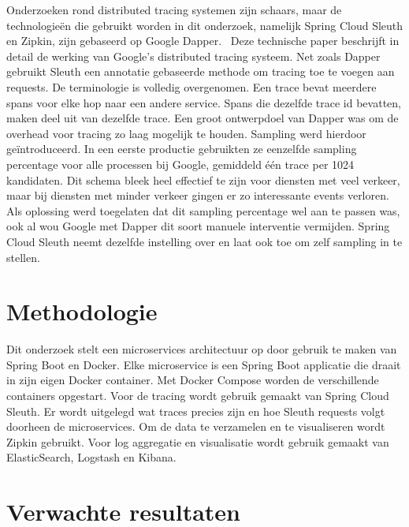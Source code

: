 \documentclass[fleqn,10pt]{voorstel}
\begin{document}
Onderzoeken rond distributed tracing systemen zijn schaars, maar de technologieën die gebruikt worden in dit onderzoek, namelijk Spring Cloud Sleuth en Zipkin, zijn gebaseerd op Google Dapper.~\autocite{Dapper2010} Deze technische paper beschrijft in detail de werking van Google's distributed tracing systeem. Net zoals Dapper gebruikt Sleuth een annotatie gebaseerde methode om tracing toe te voegen aan requests. De terminologie is volledig overgenomen. Een trace bevat meerdere spans voor elke hop naar een andere service. Spans die dezelfde trace id bevatten, maken deel uit van dezelfde trace. Een groot ontwerpdoel van Dapper was om de overhead voor tracing zo laag mogelijk te houden. Sampling werd hierdoor geïntroduceerd. In een eerste productie gebruikten ze eenzelfde sampling percentage voor alle processen bij Google, gemiddeld één trace per 1024 kandidaten. Dit schema bleek heel effectief te zijn voor diensten met veel verkeer, maar bij diensten met minder verkeer gingen er zo interessante events verloren. Als oplossing werd toegelaten dat dit sampling percentage wel aan te passen was, ook al wou Google met Dapper dit soort manuele interventie vermijden. Spring Cloud Sleuth neemt dezelfde instelling over en laat ook toe om zelf sampling in te stellen. \\


\section{Methodologie}
\label{sec:methodologie}

Dit onderzoek stelt een microservices architectuur op door gebruik te maken van Spring Boot en Docker. Elke microservice is een Spring Boot applicatie die draait in zijn eigen Docker container. Met Docker Compose worden de verschillende containers opgestart. Voor de tracing wordt gebruik gemaakt van Spring Cloud Sleuth. Er wordt uitgelegd wat traces precies zijn en hoe Sleuth requests volgt doorheen de microservices. Om de data te verzamelen en te visualiseren wordt Zipkin gebruikt. Voor log aggregatie en visualisatie wordt gebruik gemaakt van ElasticSearch, Logstash en Kibana. \\

\section{Verwachte resultaten}
\label{sec:verwachte_resultaten}
\end{document}
